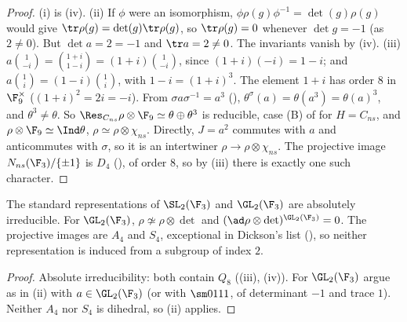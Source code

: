 \begin{proof}
(i) is (iv). (ii) If $\phi$ were an isomorphism, $\phi\rho(g)\phi^{-1}=\det(g)\rho(g)$ would give $\tr\rho(g)=\det(g)\tr\rho(g)$, so
$\tr\rho(g)=0$ whenever $\det g=-1$ (as $2\ne0$). But $\det a=2=-1$ and $\tr a=2\ne0$. The invariants vanish by (iv).
(iii) $a\binom1{-i}=\binom{1+i}{1-i}=(1+i)\binom1{-i}$, since $(1+i)(-i)=1-i$; and $a\binom1i=(1-i)\binom1i$, with $1-i=(1+i)^3$. The element $1+i$ has order $8$ in
$\F_9^\times$ ($(1+i)^2=2i=-i$). From $\sigma a\sigma^{-1}=a^3$ (), $\theta^\sigma(a)=\theta(a^3)=\theta(a)^3$, and $\theta^3\ne\theta$. So $\Res_{C_{ns}}\rho\otimes\F_9\simeq\theta\oplus\theta^3$ is
reducible, case (B) of  for $H=C_{ns}$, and $\rho\otimes\F_9\simeq\Ind\theta$, $\rho\simeq\rho\otimes\chi_{ns}$. Directly, $J=a^2$ commutes with
$a$ and anticommutes with $\sigma$, so it is an intertwiner $\rho\to\rho\otimes\chi_{ns}$. The projective image $N_{ns}(\F_3)/\{\pm1\}$ is $D_4$ (),
of order $8$, so by (iii) there is exactly one such character.
\end{proof}

\begin{proposition}[$\SL_2(\F_3)$ and $\GL_2(\F_3)$]\label{prop:reps:gl23-sl23}
The standard representations of $\SL_2(\F_3)$ and $\GL_2(\F_3)$ are absolutely irreducible. For $\GL_2(\F_3)$, $\rho\not\simeq\rho\otimes\det$ and
$(\ad\rho\otimes\det)^{\GL_2(\F_3)}=0$. The projective images are $A_4$ and $S_4$, exceptional in Dickson's list (), so neither
representation is induced from a subgroup of index $2$.
\end{proposition}

\begin{proof}
Absolute irreducibility: both contain $Q_8$ ((iii), (iv)). For $\GL_2(\F_3)$ argue as in (ii) with
$a\in\GL_2(\F_3)$ (or with $\sm0111$, of determinant $-1$ and trace $1$). Neither $A_4$ nor $S_4$ is dihedral, so (ii)
applies.
\end{proof}

